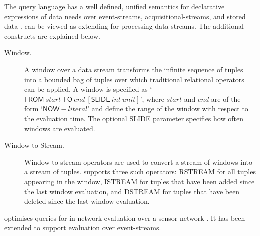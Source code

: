 The \sneeql query language has a well defined, unified semantics for declarative expressions of data needs over event-streams, acquisitional-streams, and stored data \cite{Brenninkmeijer_08}.
\sneeql can be viewed as extending \sql for processing data streams.
The additional constructs are explained below.
\begin{description}
\item[Window.] A window over a data stream transforms the infinite sequence of tuples into a bounded bag of tuples over which traditional relational operators can be applied. A window is specified as `$\textsf{FROM}\ {start}\ \textsf{TO}\ {end}\ [\textsf{SLIDE}\ {int}\ {unit}]$', where ${start}$ and ${end}$ are of the form `$\textsf{NOW} - {literal}$' and define the range of the window with respect to the evaluation time. The optional \textsf{SLIDE} parameter specifies how often windows are evaluated.

\item[Window-to-Stream.] Window-to-stream operators are used to convert a stream of windows into a stream of tuples. \sneeql supports three such operators: \textsf{RSTREAM} for all tuples appearing in the window, \textsf{ISTREAM} for tuples that have been added since the last window evaluation, and \textsf{DSTREAM} for tuples that have been deleted since the last window evaluation.
\end{description}
\snee optimises \sneeql queries for in-network evaluation over a sensor network \cite{Galpin_09}. It has been extended to support evaluation over event-streams.


